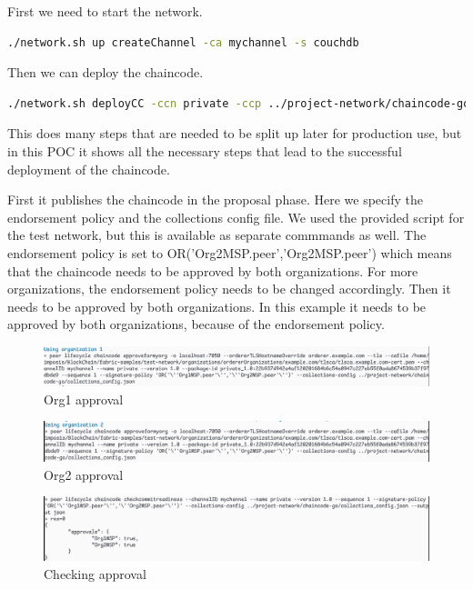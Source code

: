 \documentclass[12pt]{article}
\begin{document}
First we need to start the network.

\begin{lstlisting}[language=bash]
./network.sh up createChannel -ca mychannel -s couchdb
\end{lstlisting}

Then we can deploy the chaincode.

\begin{lstlisting}[language=bash]
./network.sh deployCC -ccn private -ccp ../project-network/chaincode-go/ -ccl go -ccep "OR('Org2MSP.peer','Org2MSP.peer')" -cccg ../project-network/chaincode-go/collections_config.json
\end{lstlisting}

This does many steps that are needed to be split up later for production use, but in this POC it shows all the necessary steps that lead to the successful deployment of the chaincode.

First it publishes the chaincode in the proposal phase.
Here we specify the endorsement policy and the collections config file. We used the provided script for the test network, but this is available as separate commmands as well.
The endorsement policy is set to OR('Org2MSP.peer','Org2MSP.peer') which means that the chaincode needs to be approved by both organizations.
For more organizations, the endorsement policy needs to be changed accordingly.
Then it needs to be approved by both organizations. In this example it needs to be approved by both organizations, because of the endorsement policy.

\begin{figure}[H]
    \centering
    \includegraphics[width=\textwidth]{imgs/org1_approval.PNG}
    \caption{Org1 approval}
    \label{fig:org1approval}
\end{figure}

\begin{figure}[H]
    \centering
    \includegraphics[width=\textwidth]{imgs/org2_approval.PNG}
    \caption{Org2 approval}
    \label{fig:org1approval}
\end{figure}

\begin{figure}[H]
    \centering
    \includegraphics[width=\textwidth]{imgs/checking_approval.PNG}
    \caption{Checking approval}
    \label{fig:checkingapproval}
\end{figure}
\end{document}
